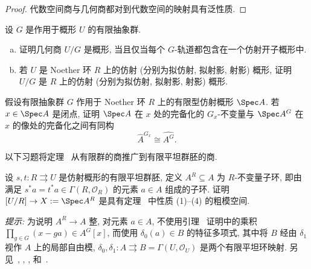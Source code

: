 \begin{proof}
代数空间商与几何商都对到代数空间的映射具有泛性质.
\end{proof}
\begin{exercise}\label{src:5.2.14}
设 $G$ 是作用于概形 $U$ 的有限抽象群.
\begin{enumerate}[(a)]
\item 证明几何商 $U/G$ 是概形, 当且仅当每个 $G$-轨道都包含在一个仿射开子概形中.
\item 若 $U$ 是 Noether 环 $R$ 上的仿射 (分别为拟仿射, 拟射影, 射影) 概形, 证明 $U/G$ 是 $R$ 上的仿射 (分别为拟仿射, 拟射影, 射影) 概形.
\end{enumerate}
\end{exercise}
\begin{exercise}\label{src:5.2.15}
假设有限抽象群 $G$ 作用于 Noether 环 $R$ 上的有限型仿射概形 $\Spec A$. 若 $x\in\Spec A$ 是闭点, 证明 $\Spec A$ 在 $x$ 处的完备化的 $G_x$-不变量与 $\Spec A^G$ 在 $x$ 的像处的完备化之间有同构
\[
\widehat A^{G_x}\cong\widehat{A^G}.
\]
\end{exercise}
以下习题将定理~ 从有限群的商推广到有限平坦群胚的商.
\begin{exercise}[困难]\label{src:5.2.16}
设 $s,t:R\rightrightarrows U$ 是仿射概形的有限平坦群胚, 定义 $A^R\subseteq A$ 为 $R$-不变量子环, 即由满足 $s^*a=t^*a\in\Gamma(R,\mathcal O_R)$ 的元素 $a\in A$ 组成的子环. 证明 $[U/R]\to X:=\Spec A^R$ 是具有定理~ 中性质 (1)--(4) 的粗模空间.

\textit{提示:} 为说明 $A^R\to A$ 整, 对元素 $a\in A$, 不使用引理~ 证明中的乘积 $\prod_{g\in G}(x-ga)\in A^G[x]$, 而使用 $\delta_0(a)\in B$ 的特征多项式, 其中将 $B$ 经由 $\delta_1$ 视作 $A$ 上的局部自由模, $\delta_0,\delta_1:A\rightrightarrows B=\Gamma(U,\mathcal O_U)$ 是两个有限平坦环映射. 另见~\cite[定理 V.4.1]{SGA3I}, \cite[命题 $5.1$]{KM97}, \cite[定理 $3.1$]{Con05b}, \cite[定理 $6.2.2$]{Ols16} 和~\cite[Tag 0DUR]{SP}.
\end{exercise}
